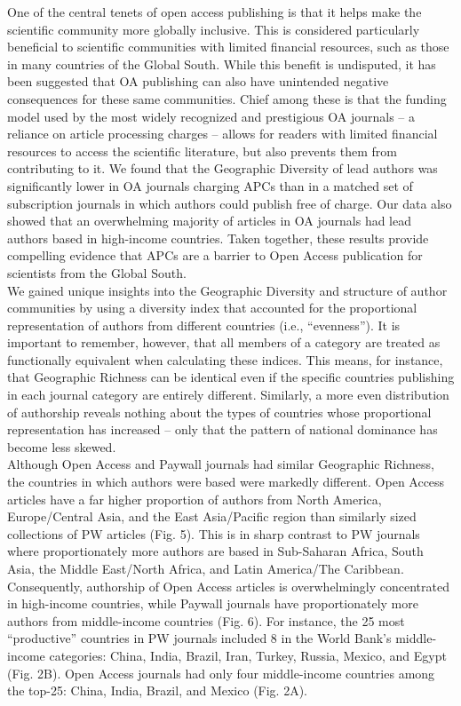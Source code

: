 \documentclass[english,man]{apa6}
\begin{document}
One of the central tenets of open access publishing is that it helps make the scientific community more globally inclusive. This is considered particularly beneficial to scientific communities with limited financial resources, such as those in many countries of the Global South. While this benefit is undisputed, it has been suggested that OA publishing can also have unintended negative consequences for these same communities. Chief among these is that the funding model used by the most widely recognized and prestigious OA journals -- a reliance on article processing charges -- allows for readers with limited financial resources to access the scientific literature, but also prevents them from contributing to it. We found that the Geographic Diversity of lead authors was significantly lower in OA journals charging APCs than in a matched set of subscription journals in which authors could publish free of charge. Our data also showed that an overwhelming majority of articles in OA journals had lead authors based in high-income countries. Taken together, these results provide compelling evidence that APCs are a barrier to Open Access publication for scientists from the Global South.\\
We gained unique insights into the Geographic Diversity and structure of author communities by using a diversity index that accounted for the proportional representation of authors from different countries (i.e., \enquote{evenness}). It is important to remember, however, that all members of a category are treated as functionally equivalent when calculating these indices. This means, for instance, that Geographic Richness can be identical even if the specific countries publishing in each journal category are entirely different. Similarly, a more even distribution of authorship reveals nothing about the types of countries whose proportional representation has increased -- only that the pattern of national dominance has become less skewed.\\
Although Open Access and Paywall journals had similar Geographic Richness, the countries in which authors were based were markedly different. Open Access articles have a far higher proportion of authors from North America, Europe/Central Asia, and the East Asia/Pacific region than similarly sized collections of PW articles (Fig. 5). This is in sharp contrast to PW journals where proportionately more authors are based in Sub-Saharan Africa, South Asia, the Middle East/North Africa, and Latin America/The Caribbean. Consequently, authorship of Open Access articles is overwhelmingly concentrated in high-income countries, while Paywall journals have proportionately more authors from middle-income countries (Fig. 6). For instance, the 25 most \enquote{productive} countries in PW journals included 8 in the World Bank's middle-income categories: China, India, Brazil, Iran, Turkey, Russia, Mexico, and Egypt (Fig. 2B). Open Access journals had only four middle-income countries among the top-25: China, India, Brazil, and Mexico (Fig. 2A).\\
\end{document}
